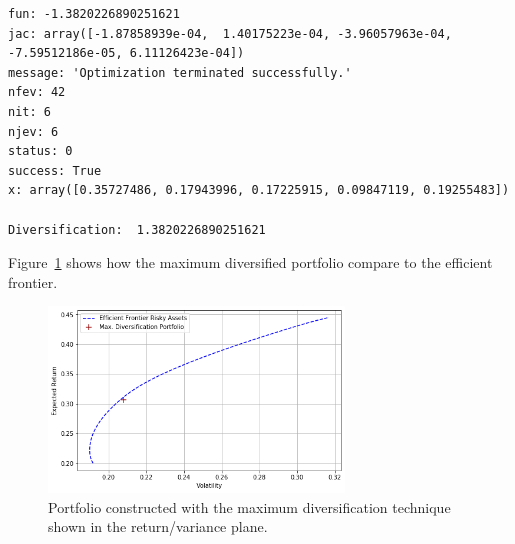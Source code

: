 \begin{tcolorbox}[breakable, size=fbox, boxrule=1pt, pad at break*=1mm,colback=cellbackground, colframe=cellborder]
\begin{Verbatim}[commandchars=\\\{\}]
fun: -1.3820226890251621
jac: array([-1.87858939e-04,  1.40175223e-04, -3.96057963e-04, -7.59512186e-05, 6.11126423e-04])
message: 'Optimization terminated successfully.'
nfev: 42
nit: 6
njev: 6
status: 0
success: True
x: array([0.35727486, 0.17943996, 0.17225915, 0.09847119, 0.19255483])

Diversification:  1.3820226890251621
\end{Verbatim}
\end{tcolorbox}

Figure~\ref{fig:max_div} shows how the maximum diversified portfolio compare to the efficient frontier.

\begin{figure}[htb]
	\centering
	\includegraphics[width=0.7\textwidth]{figures/max_div.png}
	\caption{Portfolio constructed with the maximum diversification technique shown in the return/variance plane.}
	\label{fig:max_div}
\end{figure}
